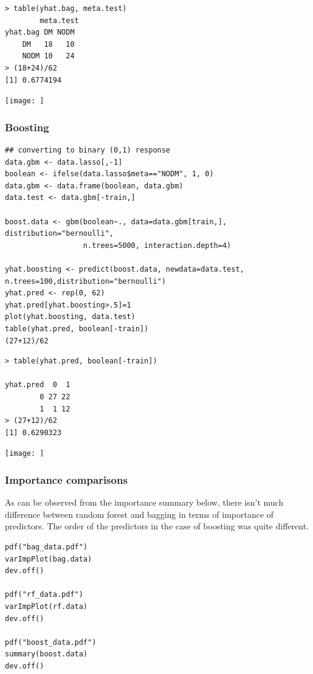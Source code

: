 \documentclass[11pt, a4paper]{article}
\begin{document}
\begin{verbatim}
> table(yhat.bag, meta.test)
        meta.test
yhat.bag DM NODM
    DM   18   10
    NODM 10   24
> (18+24)/62
[1] 0.6774194
\end{verbatim}

\texttt{[image: ]}
\subsubsection{Boosting}
\label{sec-1-2-7}


\begin{verbatim}
## converting to binary (0,1) response
data.gbm <- data.lasso[,-1]
boolean <- ifelse(data.lasso$meta=="NODM", 1, 0)
data.gbm <- data.frame(boolean, data.gbm)
data.test <- data.gbm[-train,]

boost.data <- gbm(boolean~., data=data.gbm[train,], distribution="bernoulli",
                  n.trees=5000, interaction.depth=4)

yhat.boosting <- predict(boost.data, newdata=data.test, n.trees=100,distribution="bernoulli")
yhat.pred <- rep(0, 62)
yhat.pred[yhat.boosting>.5]=1
plot(yhat.boosting, data.test)
table(yhat.pred, boolean[-train])
(27+12)/62
\end{verbatim}


\begin{verbatim}
> table(yhat.pred, boolean[-train])
         
yhat.pred  0  1
        0 27 22
        1  1 12
> (27+12)/62
[1] 0.6290323
\end{verbatim}

\texttt{[image: ]}
\subsubsection{Importance comparisons}
\label{sec-1-2-8}

As can be observed from the importance summary below, there isn't
much difference between random forest and bagging in terms of
importance of predictors. The order of the predictors in the case of
boosting was quite different.


\begin{verbatim}
pdf("bag_data.pdf")
varImpPlot(bag.data)
dev.off()

pdf("rf_data.pdf")
varImpPlot(rf.data)
dev.off()

pdf("boost_data.pdf")
summary(boost.data)
dev.off()
\end{verbatim}
\end{document}
